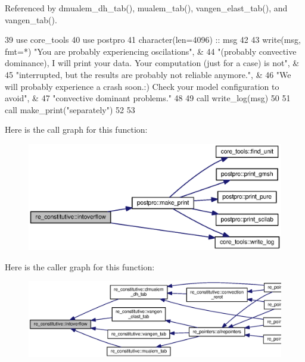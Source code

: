 Referenced by dmualem\+\_\+dh\+\_\+tab(), mualem\+\_\+tab(), vangen\+\_\+elast\+\_\+tab(), and vangen\+\_\+tab().


\begin{DoxyCode}
39       \textcolor{keywordtype}{use }core_tools
40       \textcolor{keywordtype}{use }postpro
41       \textcolor{keywordtype}{character(len=4096)} :: msg
42       
43       \textcolor{keyword}{write}(msg, fmt=*) \textcolor{stringliteral}{"You are probably experiencing oscilations"}, & 
44               \textcolor{stringliteral}{"(probably convective dominance), I will print your data. Your computation (just for a case)
       is not"}\textcolor{comment}{, &}
45 \textcolor{comment}{              }\textcolor{stringliteral}{"interrupted, but the results are probably not reliable anymore."}\textcolor{comment}{,  & }
46 \textcolor{comment}{              }\textcolor{stringliteral}{"We will probably experience a crash soon.:) Check your model configuration to avoid"}\textcolor{comment}{, &}
47 \textcolor{comment}{              }\textcolor{stringliteral}{"convective dominant problems."}
48               
49       \textcolor{keyword}{call }write_log(msg)
50       
51       \textcolor{keyword}{call }make_print(\textcolor{stringliteral}{"separately"})
52               
53       
\end{DoxyCode}


Here is the call graph for this function\+:\nopagebreak
\begin{figure}[H]
\begin{center}
\leavevmode
\includegraphics[width=350pt]{namespacere__constitutive_aaab88fb88c11ce508ad8240a96275a6b_cgraph}
\end{center}
\end{figure}




Here is the caller graph for this function\+:\nopagebreak
\begin{figure}[H]
\begin{center}
\leavevmode
\includegraphics[width=350pt]{namespacere__constitutive_aaab88fb88c11ce508ad8240a96275a6b_icgraph}
\end{center}
\end{figure}


